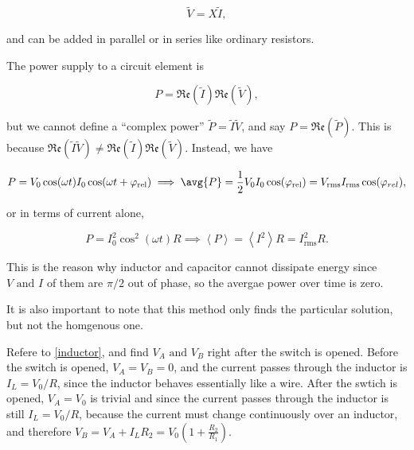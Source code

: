 \documentclass[english,a4paper,12pt]{report}
\begin{document}
\begin{equation}
    \tilde{V} = X \tilde{I},
\end{equation}

and can be added in parallel or in series like ordinary resistors. 

The power supply to a circuit element is 

\begin{equation}
    P = \mathfrak{Re} (\tilde{I} )\mathfrak{Re} (\tilde{V} ),
\end{equation}

but we cannot define a ``complex power'' \(\tilde{P} = \tilde{I} \tilde{V}   \), and say \(P = \mathfrak{Re} (\tilde{P} ) \). This is because \(\mathfrak{Re} (\tilde{I} \tilde{V}  ) \neq \mathfrak{Re} (\tilde{I} ) \mathfrak{Re} (\tilde{V} )  \). Instead, we have 

\begin{equation}
    P = V_0 \cos (\omega t) I_0 \cos (\omega t+ \varphi _{\text{rel} } ) \implies \avg{P} = \frac{1}{2}V_0 I_0 \cos (\varphi _{\text{rel} }) = V_{\text{rms} }I_{\text{rms} }\cos (\varphi _{rel}),
\end{equation}

or in terms of current alone,

\begin{equation}
    P = I_0 ^2 \cos ^2(\omega t) R \implies \left \langle {P} \right \rangle = \left \langle {I^2} \right \rangle R = I_{\text{rms} }^2R. 
\end{equation}

This is the reason why inductor and capacitor cannot dissipate energy since \(V \text { and } I\) of them are \(\pi /2 \) out of phase, so the avergae power over time is zero.  

It is also important to note that this method only finds the particular solution, but not the homgenous one.

{Refere to \cref{inductor}, and find \(V_{A} \text { and } V_{B}  \) right after the switch is opened.}
{Before the switch is opened, \(V_{A} = V_{B} = 0\), and the current passes through the inductor is \(I_{L} = V_0 /R  \), since the inductor behaves essentially like a wire. After the swtich is opened, \(V_{A} = V_{0}  \) is trivial and since the current passes through the inductor is still \(I_{L} = V_0 /R  \), because the current must change continuously over an inductor, and therefore \(V_{B} = V_{A} + I_{L}R_2 = V_{0} \left( 1+ \frac{R_2 }{R_1 }  \right)   \).   } 
\end{document}
